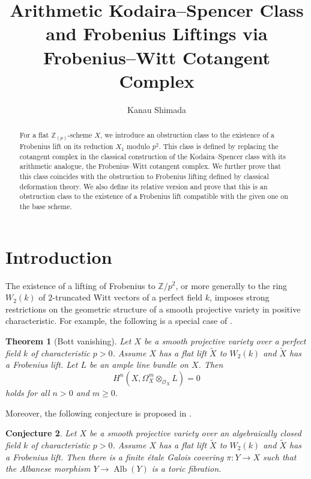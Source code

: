 \documentclass[11pt, a4paper]{amsart}
\title[Arithmetic Kodaira--Spencer Class and Frobenius Liftings]{Arithmetic Kodaira--Spencer Class and Frobenius Liftings via Frobenius--Witt Cotangent Complex}
\author{Kanau Shimada}
\date{}
\theoremstyle{plain}
\newtheorem{theorem}{Theorem}[section]
\newtheorem{conj}[theorem]{Conjecture}
\theoremstyle{definition}
\begin{document}
\maketitle
\begin{abstract}
    For a flat $\mathbb{Z}_{(p)}$-scheme $X$, we introduce an obstruction class to the existence of a Frobenius lift on its reduction $X_1$ modulo $p^2$. This class is defined by replacing the cotangent complex in the classical construction of the Kodaira--Spencer class with its arithmetic analogue, the Frobenius--Witt cotangent complex. We further prove that this class coincides with the obstruction to Frobenius lifting defined by classical deformation theory. We also define its relative version and prove that this is an obstruction class to the existence of a Frobenius lift compatible with the given one on the base scheme. 
\end{abstract}
\tableofcontents
\section{Introduction}
The existence of a lifting of Frobenius to $\mathbb{Z}/p^2$, or more generally to the ring $W_2(k)$ of $2$-truncated Witt vectors of a perfect field $k$, imposes strong restrictions on the geometric structure of a smooth projective variety in positive characteristic. For example, the following is a special case of \cite[Theorem 3]{BTLM97}. 
\begin{theorem}[Bott vanishing]
    Let $X$ be a smooth projective variety over a perfect field $k$ of characteristic $p>0$. Assume $X$ has a flat lift $\widetilde X$ to $W_2(k)$ and $\widetilde X$ has a Frobenius lift. Let $L$ be an ample line bundle on $X$. Then\[H^n(X,\Omega_X^m\otimes _{\mathcal O_X}L)=0\] holds for all $n>0$ and $m\ge0$.
\end{theorem}
Moreover, the following conjecture is proposed in \cite[Conjecture 1]{AWZ21}. 
\begin{conj}
    Let $X$ be a smooth projective variety over an algebraically closed field $k$ of characteristic $p>0$. Assume $X$ has a flat lift $\widetilde X$ to $W_2(k)$ and $\widetilde X$ has a Frobenius lift. Then there is a finite \'etale Galois covering $\pi:Y\to X$ such that the Albanese morphism $Y\to \operatorname{Alb}(Y)$ is a toric fibration. 
\end{conj}
\end{document}
